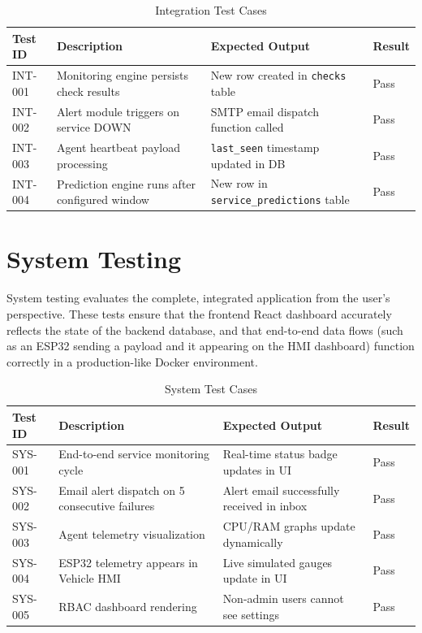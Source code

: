 \documentclass[12pt,a4paper,oneside]{report}
\begin{document}
\begin{table}[H]
\centering
\begin{tabularx}{\textwidth}{|l|X|X|l|}
\hline
\textbf{Test ID} & \textbf{Description} & \textbf{Expected Output} & \textbf{Result} \\
\hline
INT-001 & Monitoring engine persists check results & New row created in \texttt{checks} table & Pass \\
\hline
INT-002 & Alert module triggers on service DOWN & SMTP email dispatch function called & Pass \\
\hline
INT-003 & Agent heartbeat payload processing & \texttt{last\_seen} timestamp updated in DB & Pass \\
\hline
INT-004 & Prediction engine runs after configured window & New row in \texttt{service\_predictions} table & Pass \\
\hline
\end{tabularx}
\caption{Integration Test Cases}
\label{tab:integration}
\end{table}

\section{System Testing}
\noindent System testing evaluates the complete, integrated application from the user's perspective. These tests ensure that the frontend React dashboard accurately reflects the state of the backend database, and that end-to-end data flows (such as an ESP32 sending a payload and it appearing on the HMI dashboard) function correctly in a production-like Docker environment.

\begin{table}[H]
\centering
\begin{tabularx}{\textwidth}{|l|X|X|l|}
\hline
\textbf{Test ID} & \textbf{Description} & \textbf{Expected Output} & \textbf{Result} \\
\hline
SYS-001 & End-to-end service monitoring cycle & Real-time status badge updates in UI & Pass \\
\hline
SYS-002 & Email alert dispatch on 5 consecutive failures & Alert email successfully received in inbox & Pass \\
\hline
SYS-003 & Agent telemetry visualization & CPU/RAM graphs update dynamically & Pass \\
\hline
SYS-004 & ESP32 telemetry appears in Vehicle HMI & Live simulated gauges update in UI & Pass \\
\hline
SYS-005 & RBAC dashboard rendering & Non-admin users cannot see settings & Pass \\
\hline
\end{tabularx}
\caption{System Test Cases}
\label{tab:system}
\end{table}
\end{document}

